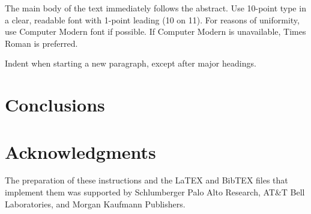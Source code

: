 \documentclass{article}
\begin{document}
The main body of the text immediately follows the abstract. 
Use 10-point type in a clear, readable font with 1-point leading (10 on
11).  For reasons of uniformity, use Computer Modern font if possible.  If
Computer Modern is unavailable, Times Roman is preferred.

Indent when starting a new paragraph, except after major headings.


\section{Conclusions}

\section*{Acknowledgments}
The preparation of these instructions and the LaTEX and BibTEX files that implement them was supported by Schlumberger Palo Alto Research, AT\&T Bell Laboratories, and Morgan Kaufmann Publishers.


%
%


\end{document}

